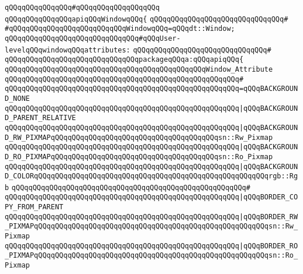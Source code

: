 \verb|qQQqqQQqqQQqqQQq#qQQqqQQqqQQqqQQqqQQq|\newline
\newline
\verb|qQQqqQQqqQQqqQQqapiqQQqWindowqQQq{|\newline
\verb|qQQqqQQqqQQqqQQqqQQqqQQqqQQqqQQq#|\newline
\verb|#qQQqqQQqqQQqqQQqqQQqqQQqqQQqWindowqQQq=qQQqdt::Window;|\newline
\newline
\verb|qQQqqQQqqQQqqQQqqQQqqQQqqQQqqQQq#qQQqUser-levelqQQqwindowqQQqattributes:|\newline
\verb|qQQqqQQqqQQqqQQqqQQqqQQqqQQqqQQq#|\newline
\verb|qQQqqQQqqQQqqQQqqQQqqQQqqQQqqQQqpackageqQQqa:qQQqapiqQQq{|\newline
\newline
\verb|qQQqqQQqqQQqqQQqqQQqqQQqqQQqqQQqqQQqqQQqqQQqqQQqWindow_Attribute|\newline
\verb|qQQqqQQqqQQqqQQqqQQqqQQqqQQqqQQqqQQqqQQqqQQqqQQqqQQqqQQq#|\newline
\verb|qQQqqQQqqQQqqQQqqQQqqQQqqQQqqQQqqQQqqQQqqQQqqQQqqQQqqQQq=qQQqBACKGROUND_NONE|\newline
\verb|qQQqqQQqqQQqqQQqqQQqqQQqqQQqqQQqqQQqqQQqqQQqqQQqqQQqqQQq|\verb#|qQQqBACKGROUND_PARENT_RELATIVE#\newline
\verb|qQQqqQQqqQQqqQQqqQQqqQQqqQQqqQQqqQQqqQQqqQQqqQQqqQQqqQQq|\verb#|qQQqBACKGROUND_RW_PIXMAPqQQqqQQqqQQqqQQqqQQqqQQqqQQqqQQqqQQqqQQqsn::Rw_Pixmap#\newline
\verb|qQQqqQQqqQQqqQQqqQQqqQQqqQQqqQQqqQQqqQQqqQQqqQQqqQQqqQQq|\verb#|qQQqBACKGROUND_RO_PIXMAPqQQqqQQqqQQqqQQqqQQqqQQqqQQqqQQqqQQqqQQqsn::Ro_Pixmap#\newline
\verb|qQQqqQQqqQQqqQQqqQQqqQQqqQQqqQQqqQQqqQQqqQQqqQQqqQQqqQQq|\verb#|qQQqBACKGROUND_COLORqQQqqQQqqQQqqQQqqQQqqQQqqQQqqQQqqQQqqQQqqQQqqQQqqQQqqQQqrgb::Rgb#\newline
\verb|qQQqqQQqqQQqqQQqqQQqqQQqqQQqqQQqqQQqqQQqqQQqqQQqqQQqqQQq#|\newline
\verb|qQQqqQQqqQQqqQQqqQQqqQQqqQQqqQQqqQQqqQQqqQQqqQQqqQQqqQQq|\verb#|qQQqBORDER_COPY_FROM_PARENT#\newline
\verb|qQQqqQQqqQQqqQQqqQQqqQQqqQQqqQQqqQQqqQQqqQQqqQQqqQQqqQQq|\verb#|qQQqBORDER_RW_PIXMAPqQQqqQQqqQQqqQQqqQQqqQQqqQQqqQQqqQQqqQQqqQQqqQQqqQQqqQQqsn::Rw_Pixmap#\newline
\verb|qQQqqQQqqQQqqQQqqQQqqQQqqQQqqQQqqQQqqQQqqQQqqQQqqQQqqQQq|\verb#|qQQqBORDER_RO_PIXMAPqQQqqQQqqQQqqQQqqQQqqQQqqQQqqQQqqQQqqQQqqQQqqQQqqQQqqQQqsn::Ro_Pixmap#\newline
